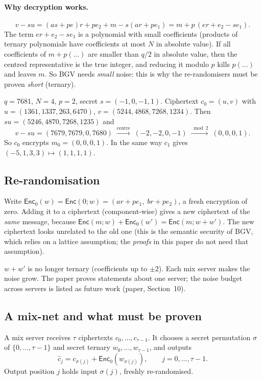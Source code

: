 \documentclass[11pt,a4paper]{article}
\newcommand{\Enc}{\mathsf{Enc}}
\newcommand{\EncZ}{\mathsf{Enc}_0}
\newcommand{\ch}{\hat{c}}
\theoremstyle{definition}
\theoremstyle{plain}
\begin{document}
\paragraph{Why decryption works.}
\[
  v-su = (as+pe)r+pe_2+m-s(ar+pe_1)= m + p\,(er+e_2-se_1).
\]
The term $er+e_2-se_1$ is a polynomial with small coefficients (products of ternary polynomials
have coefficients at most $N$ in absolute value). If all coefficients of $m+p(\dots)$ are smaller
than $q/2$ in absolute value, then the centred representative is the true integer, and reducing it
modulo $p$ kills $p(\dots)$ and leaves $m$. So BGV needs \emph{small} noise: this is why the
re-randomisers must be proven \emph{short} (ternary).

\begin{toyrun}
$q=7681$, $N=4$, $p=2$, secret $s=(-1,0,-1,1)$. Ciphertext $c_0=(u,v)$ with
$u=(1361,1337,263,6470)$, $v=(5244,4868,7268,1234)$.
Then $su=(5246,4870,7268,1235)$ and
\[
 v-su=(7679,7679,0,7680) \;\xrightarrow{\text{centre}}\; (-2,-2,0,-1)\;\xrightarrow{\bmod 2}\;(0,0,0,1).
\]
So $c_0$ encrypts $m_0=(0,0,0,1)$. In the same way $c_1$ gives $(-5,1,3,3)\mapsto(1,1,1,1)$.
\end{toyrun}

\subsection{Re-randomisation}

Write $\EncZ(w)=\Enc(0;w)=(ar+pe_1,\;br+pe_2)$, a fresh encryption of zero. Adding it to a ciphertext
(component-wise) gives a new ciphertext of the \emph{same} message, because
$\Enc(m;w)+\EncZ(w')=\Enc(m;w+w')$. The new ciphertext looks unrelated to the old one (this is the
semantic security of BGV, which relies on a lattice assumption; the \emph{proofs} in this paper do
not need that assumption).

\begin{caution}
$w+w'$ is no longer ternary (coefficients up to $\pm 2$). Each mix server makes the noise grow.
The paper proves statements about one server; the noise budget across servers is listed as future
work (paper, Section~10).
\end{caution}

\subsection{A mix-net and what must be proven}

A mix server receives $\tau$ ciphertexts $c_0,\dots,c_{\tau-1}$. It chooses a secret permutation
$\sigma$ of $\{0,\dots,\tau-1\}$ and secret ternary $w_0,\dots,w_{\tau-1}$, and outputs
\[
  \ch_j = c_{\sigma(j)}+\EncZ(w_{\sigma(j)}),\qquad j=0,\dots,\tau-1 .
\]
Output position $j$ holds input $\sigma(j)$, freshly re-randomised.
\end{document}
